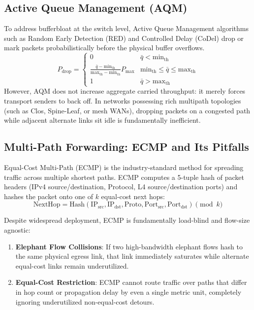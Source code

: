 \subsection{Active Queue Management (AQM)}
To address bufferbloat at the switch level, Active Queue Management algorithms such as Random Early Detection (RED) \cite{floyd1993random} and Controlled Delay (CoDel) \cite{nichols2012controlling} drop or mark packets probabilistically before the physical buffer overflows.
\begin{equation}
  P_{\text{drop}} = \begin{cases} 
    0 & \bar{q} < \text{min}_{\text{th}} \\
    \frac{\bar{q} - \text{min}_{\text{th}}}{\text{max}_{\text{th}} - \text{min}_{\text{th}}} P_{\text{max}} & \text{min}_{\text{th}} \le \bar{q} \le \text{max}_{\text{th}} \\
    1 & \bar{q} > \text{max}_{\text{th}}
  \end{cases}
\end{equation}
However, AQM does not increase aggregate carried throughput: it merely forces transport senders to back off. In networks possessing rich multipath topologies (such as Clos, Spine-Leaf, or mesh WANs), dropping packets on a congested path while adjacent alternate links sit idle is fundamentally inefficient.

\subsection{Multi-Path Forwarding: ECMP and Its Pitfalls}
Equal-Cost Multi-Path (ECMP) \cite{hopps2000analysis} is the industry-standard method for spreading traffic across multiple shortest paths. ECMP computes a 5-tuple hash of packet headers (IPv4 source/destination, Protocol, L4 source/destination ports) and hashes the packet onto one of $k$ equal-cost next hops:
\begin{equation}
  \text{NextHop} = \text{Hash}(\text{IP}_{\text{src}}, \text{IP}_{\text{dst}}, \text{Proto}, \text{Port}_{\text{src}}, \text{Port}_{\text{dst}}) \pmod k
\end{equation}

\begin{hazardbox}
Despite widespread deployment, ECMP is fundamentally load-blind and flow-size agnostic:
\begin{enumerate}
  \item \textbf{Elephant Flow Collisions}: If two high-bandwidth elephant flows hash to the same physical egress link, that link immediately saturates while alternate equal-cost links remain underutilized.
  \item \textbf{Equal-Cost Restriction}: ECMP cannot route traffic over paths that differ in hop count or propagation delay by even a single metric unit, completely ignoring underutilized non-equal-cost detours.
\end{enumerate}
\end{hazardbox}

